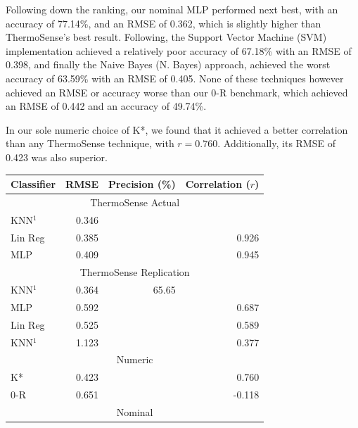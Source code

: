 \documentclass[../thesis/thesis.tex]{subfiles}
\begin{document}
Following down the ranking, our nominal MLP performed next best, with an accuracy of 77.14\%, and an RMSE of 0.362, which is slightly higher than ThermoSense's best result. Following, the Support Vector Machine (SVM) implementation achieved a relatively poor accuracy of 67.18\% with an RMSE of 0.398, and finally the Naive Bayes (N. Bayes) approach, achieved the worst accuracy of 63.59\% with an RMSE of 0.405. None of these techniques however achieved an RMSE or accuracy worse than our 0-R benchmark, which achieved an RMSE of 0.442 and an accuracy of 49.74\%.

In our sole numeric choice of K*, we found that it achieved a better correlation than any ThermoSense technique, with $r = 0.760$. Additionally, its RMSE of 0.423 was also superior.

\begin{table}
\centering
\begin{tabular}{|l|r|r|r|}
\hline
\textbf{Classifier} & \textbf{RMSE} & \textbf{Precision (\%)} & \textbf{Correlation ($r$)} \\ \hline
\multicolumn{4}{|c|}{\cellcolor{black!15} ThermoSense Actual}                         \\ \hline
KNN$^1$             & 0.346         &             &              \\ \hline
Lin Reg             & 0.385         &             & 0.926        \\ \hline
MLP                 & 0.409         &             & 0.945        \\ \hline
\multicolumn{4}{|c|}{\cellcolor{black!15} ThermoSense Replication}                    \\ \hline
KNN$^1$             & 0.364         & 65.65       &              \\ \hline
MLP                 & 0.592         &             & 0.687        \\ \hline
Lin Reg             & 0.525         &             & 0.589        \\ \hline
KNN$^1$             & 1.123         &             & 0.377        \\ \hline
\multicolumn{4}{|c|}{\cellcolor{black!15} Numeric}                                    \\ \hline
K*                  & 0.423         &             & 0.760        \\ \hline
0-R                 & 0.651         &             & -0.118       \\ \hline
\multicolumn{4}{|c|}{\cellcolor{black!15} Nominal}                                    \\ \hline

\end{tabular}
\end{table}
\end{document}
